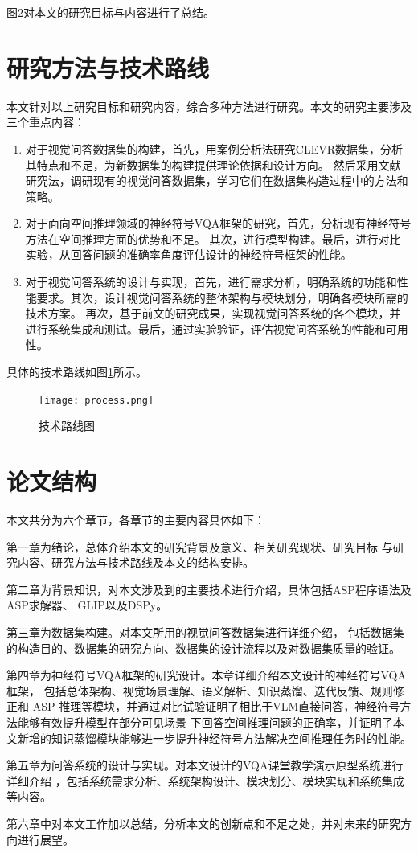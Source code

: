 图\ref{}对本文的研究目标与内容进行了总结。
\section{研究方法与技术路线}
本文针对以上研究目标和研究内容，综合多种方法进行研究。本文的研究主要涉及三个重点内容：
\begin{enumerate}[label=(\arabic*),itemsep=0pt,parsep=0pt]
    \item 对于视觉问答数据集的构建，首先，用案例分析法研究CLEVR数据集，分析其特点和不足，为新数据集的构建提供理论依据和设计方向。
然后采用文献研究法，调研现有的视觉问答数据集，学习它们在数据集构造过程中的方法和策略。
    \item 对于面向空间推理领域的神经符号VQA框架的研究，首先，分析现有神经符号方法在空间推理方面的优势和不足。
其次，进行模型构建。最后，进行对比实验，从回答问题的准确率角度评估设计的神经符号框架的性能。
    \item 对于视觉问答系统的设计与实现，首先，进行需求分析，明确系统的功能和性能要求。其次，设计视觉问答系统的整体架构与模块划分，明确各模块所需的技术方案。
再次，基于前文的研究成果，实现视觉问答系统的各个模块，并进行系统集成和测试。最后，通过实验验证，评估视觉问答系统的性能和可用性。
\end{enumerate}

具体的技术路线如图\ref{roadmap}所示。

\begin{figure}[h]
    \centering
    \texttt{[image: process.png]}
    \caption{技术路线图\label{roadmap}}
\end{figure}

\section{论文结构}
本文共分为六个章节，各章节的主要内容具体如下：

第一章为绪论，总体介绍本文的研究背景及意义、相关研究现状、研究目标
与研究内容、研究方法与技术路线及本文的结构安排。

第二章为背景知识，对本文涉及到的主要技术进行介绍，具体包括ASP程序语法及ASP求解器、
GLIP以及DSPy。

第三章为数据集构建。对本文所用的视觉问答数据集进行详细介绍，
包括数据集的构造目的、数据集的研究方向、数据集的设计流程以及对数据集质量的验证。

第四章为神经符号VQA框架的研究设计。本章详细介绍本文设计的神经符号VQA框架，
包括总体架构、视觉场景理解、语义解析、知识蒸馏、迭代反馈、规则修正和 ASP 推理等模块，并通过对比试验证明了相比于VLM直接问答，神经符号方法能够有效提升模型在部分可见场景
下回答空间推理问题的正确率，并证明了本文新增的知识蒸馏模块能够进一步提升神经符号方法解决空间推理任务时的性能。

第五章为问答系统的设计与实现。对本文设计的VQA课堂教学演示原型系统进行详细介绍
，包括系统需求分析、系统架构设计、模块划分、模块实现和系统集成等内容。

第六章中对本文工作加以总结，分析本文的创新点和不足之处，并对未来的研究方向进行展望。
